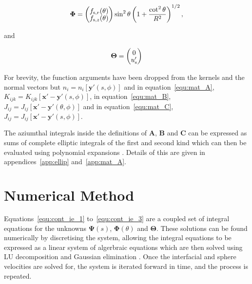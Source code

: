\documentclass[12pt]{article}
\begin{document}
\begin{equation}
\setlength{\arraycolsep}{5pt}
\renewcommand{\arraystretch}{1.3}
\boldsymbol{\Phi} = \left( \begin{matrix}
f_{\text{s},r}(\theta) \\[-5pt]
f_{\text{s},z}(\theta) \\
\end{matrix} \right) \sin^{2}\theta \left(1 + \frac{\cot^{2}\theta}{R^{2}}\right)^{1/2}  ,
\label{equ:vec_b}
\end{equation}

and 

\begin{equation}
\setlength{\arraycolsep}{5pt}
\renewcommand{\arraystretch}{1.3}
\boldsymbol{\Theta} = \left( \begin{matrix}
0 \\[-5pt]
u'_{\text{s}} \\
\end{matrix} \right) 
\label{equ:vec_d}
\end{equation}

For brevity, the function arguments have been dropped from the kernels and the normal vectors but $n_{i} = n_{i}[\boldsymbol{y'}(s, \phi)]$ and in equation~\ref{equ:mat_A}, $K_{ijk} = K_{ijk}[\boldsymbol{x'} - \boldsymbol{y'}(s, \phi)]$, in equation~\ref{equ:mat_B}, $J_{ij} = J_{ij}[\boldsymbol{x'} - \boldsymbol{y'}(\theta, \phi)]$ and in equation~\ref{equ:mat_C}, $J_{ij} = J_{ij}[\boldsymbol{x'} - \boldsymbol{y'}(s, \phi)]$.

The aziumthal integrals inside the definitions of $\boldsymbol{A}$, $\boldsymbol{B}$ and $\boldsymbol{C}$ can be expressed as sums of complete elliptic integrals of the first and second kind \citep{Lee82, Geller86, Graziani89, Pozrikidis92, Manga94, Roumeliotis00} which can then be evaluated using polynomial expansions \citep{Abramowitz72}. Details of this are given in appendices~\ref{app:ellip} and~\ref{app:mat_A}.

\section{Numerical Method}
\label{sec:num_meth}

Equations~\ref{equ:cont_ie_1} to~\ref{equ:cont_ie_3} are a coupled set of integral equations for the unknowns $\boldsymbol{\Psi}(s)$, $\boldsymbol{\Phi}(\theta)$ and $\boldsymbol{\Theta}$. These solutions can be found numerically by discretising the system, allowing the integral equations to be expressed as a linear system of algerbraic equations which are then solved using LU decomposition and Gaussian elimination \citep{Riley06, Press07}. Once the interfacial and sphere velocities are solved for, the system is iterated forward in time, and the process is repeated. 
\end{document}
